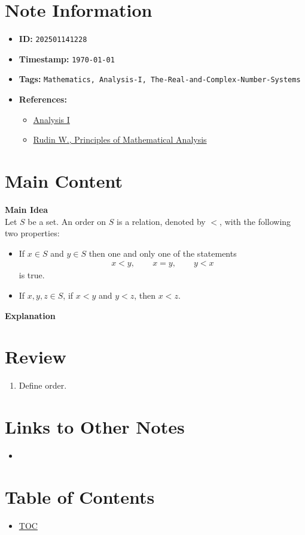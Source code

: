 \clearpage
{}
\label{202501141228}
\renewcommand{\notetitle}{Order}

\section*{Note Information}
\begin{itemize}
  \item \textbf{ID:} \texttt{202501141228}
  \item \textbf{Timestamp:} \texttt{\today \ \currenttime}
  \item \textbf{Tags:} \texttt{Mathematics, Analysis-I, The-Real-and-Complex-Number-Systems}
  \item \textbf{References:}
    \begin{itemize}
      \item \href{https://ocw.mit.edu/courses/18-100b-analysis-i-fall-2010/}{Analysis I}
      \item \href{/home/garrett/Personal/References/Mathematics/Analysis-I/Rudin.pdf}{Rudin W., Principles of Mathematical Analysis}
    \end{itemize}
\end{itemize}


\section*{Main Content}
\textbf{Main Idea}\\
Let $S$ be a set. An order on $S$ is a relation, denoted by $<$, with the following two properties:
\begin{itemize}
  \item If $x \in S$ and $y \in S$ then one and only one of the statements
  \begin{align*}
    x < y, \hspace{25pt} x = y, \hspace{25pt} y < x
  \end{align*}
  is true.
\item If $x,y,z \in S$, if $x < y$ and $y < z$, then $x < z$.\\
\end{itemize}

\textbf{Explanation}\\


\section*{Review}
\begin{enumerate}
  \item Define order.
\end{enumerate}


\section*{Links to Other Notes}
\begin{itemize}
  \item \hyperref[]{}
\end{itemize}

\section*{Table of Contents}

\begin{itemize}
  \item \hyperref[toc]{TOC}
\end{itemize}


